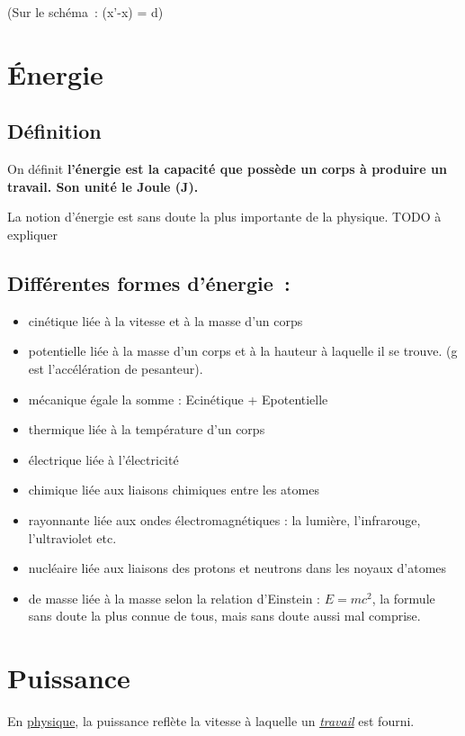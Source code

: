 \begin{multicols}{2}
(Sur le schéma~: (x'-x) = d)

\section{Énergie}

\subsection{Définition}
On définit \textbf{ l'énergie est la capacité que
possède un corps à produire un travail. Son unité le Joule (J).}

La notion d'énergie est sans doute la plus importante de la physique. 
TODO à expliquer

\subsection{Différentes formes d'énergie~: }

\begin{itemize}
\item cinétique liée à la vitesse et à la masse d'un corps
\item potentielle liée à la masse d'un corps et à la hauteur à laquelle il
se trouve. (g est l'accélération de pesanteur).
\item mécanique égale la somme : Ecinétique + Epotentielle
\item thermique liée à la température d'un corps
\item électrique liée à l'électricité
\item chimique liée aux liaisons chimiques entre les atomes
\item rayonnante liée aux ondes électromagnétiques : la lumière,
l'infrarouge, l'ultraviolet etc.
\item nucléaire liée aux liaisons des protons et neutrons dans les noyaux
d'atomes
\item de masse liée à la masse selon la relation d'Einstein : $E = m c^2$, 
la formule sans doute la plus connue de tous, mais sans doute aussi mal 
comprise.
\end{itemize}



\section{Puissance }

En \href{https://fr.wikipedia.org/wiki/Physique}{physique},
la puissance reflète la vitesse à laquelle un
\href{https://fr.wikipedia.org/wiki/Travail_d\%27une_force}{\emph{\emph{travail}}}
est fourni.


\end{multicols}

